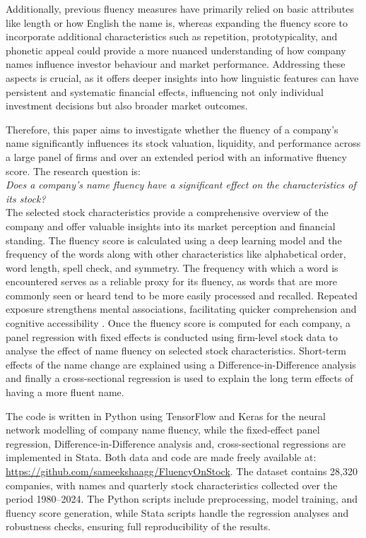 \documentclass[a4paper,11pt]{report}
\begin{document}
Additionally, previous fluency measures have primarily relied on basic attributes like length or how English the name is, whereas expanding the fluency score to incorporate additional characteristics such as repetition, prototypicality, and phonetic appeal could provide a more nuanced understanding of how company names influence investor behaviour and market performance. Addressing these aspects is crucial, as it offers deeper insights into how linguistic features can have persistent and systematic financial effects, influencing not only individual investment decisions but also broader market outcomes.

Therefore, this paper aims to investigate whether the fluency of a company's name significantly influences its stock valuation, liquidity, and performance across a large panel of firms and over an extended period with an informative fluency score. The research question is: \\

\textit{Does a company's name fluency have a significant effect on the characteristics of its stock?}\\

The selected stock characteristics provide a comprehensive overview of the company and offer valuable insights into its market perception and financial standing. The fluency score is calculated using a deep learning model and the frequency of the words along with other characteristics like alphabetical order, word length, spell check, and symmetry. The frequency with which a word is encountered serves as a reliable proxy for its fluency, as words that are more commonly seen or heard tend to be more easily processed and recalled. Repeated exposure strengthens mental associations, facilitating quicker comprehension and cognitive accessibility \cite{open2009}. Once the fluency score is computed for each company, a panel regression with fixed effects is conducted using firm-level stock data to analyse the effect of name fluency on selected stock characteristics. Short-term effects of the name change are explained using a Difference-in-Difference analysis and finally a cross-sectional regression is used to explain the long term effects of having a more fluent name.  

The code is written in Python using TensorFlow and Keras for the neural network modelling of company name fluency, while the fixed-effect panel regression, Difference-in-Difference analysis and, cross-sectional regressions are implemented in Stata. Both data and code are made freely available at: \url{https://github.com/sameekshaagg/FluencyOnStock}. The dataset contains 28,320 companies, with names and quarterly stock characteristics collected over the period 1980–2024. The Python scripts include preprocessing, model training, and fluency score generation, while Stata scripts handle the regression analyses and robustness checks, ensuring full reproducibility of the results.
\end{document}
